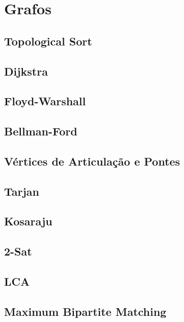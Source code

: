 \section{Grafos}
\subsection{Topological Sort}
\raggedbottom
\hrulefill
\subsection{Dijkstra}
\raggedbottom
\hrulefill
\subsection{Floyd-Warshall}
\raggedbottom
\hrulefill
\subsection{Bellman-Ford}
\raggedbottom
\hrulefill
\subsection{Vértices de Articulação e Pontes}
\raggedbottom
\hrulefill
\subsection{Tarjan}
\raggedbottom
\hrulefill
\subsection{Kosaraju}
\raggedbottom
\hrulefill
\subsection{2-Sat}
\raggedbottom
\hrulefill
\subsection{LCA}
\raggedbottom
\hrulefill
\subsection{Maximum Bipartite Matching}
\raggedbottom
\hrulefill
